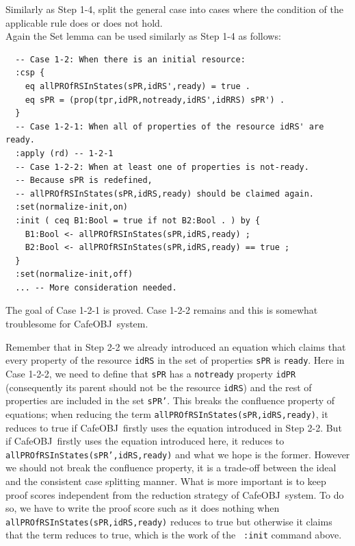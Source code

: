 \documentclass[12pt]{report}
\newcommand{\stt}[1]{{\small{\tt {#1}}}}
\newcommand{\cafeobj}{{\sf CafeOBJ}~}
\begin{document}
 Similarly as Step 1-4, split the general case
into cases where the condition of the applicable rule does or does not
hold. \\ Again the Set lemma can be used similarly as Step 1-4 as
follows:
\begin{verbatim}
  -- Case 1-2: When there is an initial resource:
  :csp {
    eq allPROfRSInStates(sPR,idRS',ready) = true .
    eq sPR = (prop(tpr,idPR,notready,idRS',idRRS) sPR') .
  }
  -- Case 1-2-1: When all of properties of the resource idRS' are ready.
  :apply (rd) -- 1-2-1
  -- Case 1-2-2: When at least one of properties is not-ready.
  -- Because sPR is redefined, 
  -- allPROfRSInStates(sPR,idRS,ready) should be claimed again.
  :set(normalize-init,on)
  :init ( ceq B1:Bool = true if not B2:Bool . ) by {
    B1:Bool <- allPROfRSInStates(sPR,idRS,ready) ;
    B2:Bool <- allPROfRSInStates(sPR,idRS,ready) == true ;
  }
  :set(normalize-init,off)
  ... -- More consideration needed.
\end{verbatim}
The goal of Case 1-2-1 is proved. Case 1-2-2 remains and this is somewhat
troublesome for \cafeobj system.

Remember that in Step 2-2 we already introduced an equation which
claims that every property of the resource {\tt idRS} in the set of
properties {\tt sPR} is {\tt ready}. Here in Case 1-2-2, we need to
define that {\tt sPR} has a {\tt notready} property {\tt idPR}
(consequently its parent should not be the resource {\tt idRS}) and
the rest of properties are included in the set {\tt sPR'}. This breaks
the confluence property of equations; when reducing the term
\stt{allPROfRSInStates(sPR,idRS,ready)}, it reduces to true if
\cafeobj firstly uses the equation introduced in Step 2-2. But if
\cafeobj firstly uses the equation introduced here, it reduces to
\stt{allPROfRSInStates(sPR',idRS,ready)} and what we hope is the
former. However we should not break the confluence property, it is a
trade-off between the ideal and the consistent case splitting manner.
What is more important is to keep proof scores independent from the
reduction strategy of \cafeobj system. To do so, we have to write the
proof score such as it does nothing when
\stt{allPROfRSInStates(sPR,idRS,ready)} reduces to true but otherwise
it claims that the term reduces to true, which is the work of the {\tt
  :init} command above.
\end{document}
